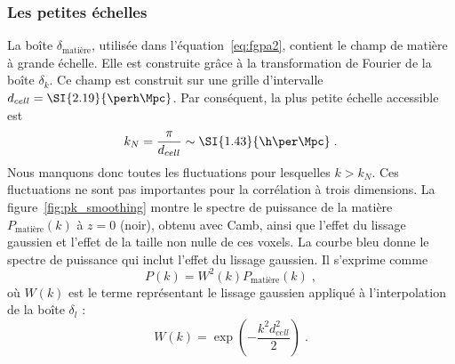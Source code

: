 \subsubsection{Les petites échelles}
La boîte $\delta_{\mathrm{matière}}$, utilisée dans l'équation~\ref{eq:fgpa2}, contient le champ de matière à grande échelle. Elle est construite grâce à la transformation de Fourier de la boîte $\delta_k$.
Ce champ est construit sur une grille d'intervalle $d_{cell} = \SI{2.19}{\perh\Mpc}$. Par conséquent, la plus petite échelle accessible est
\begin{equation}
  k_N = \frac{\pi}{d_{cell}} \sim \SI{1.43}{\h\per\Mpc} \; .
\end{equation}
Nous manquons donc toutes les fluctuations pour lesquelles $k > k_N$.
Ces fluctuations ne sont pas importantes pour la corrélation à trois dimensions. La figure~\ref{fig:pk_smoothing} montre le spectre de puissance de la matière $P_{\mathrm{matière}}(k)$ à $z=0$ (noir), obtenu avec Camb, ainsi que l'effet du lissage gaussien et l'effet de la taille non nulle de ces voxels.
  La courbe bleu donne le spectre de puissance qui inclut l'effet du lissage gaussien. Il s'exprime comme
  \begin{equation}
    P(k) =  W^2(k) P_{\mathrm{matière}}(k) \; ,
  \end{equation}
  où $W(k)$ est le terme représentant le lissage gaussien appliqué à l'interpolation de la boîte $\delta_l$ :
  \begin{equation}
    \label{eq:gauss_smoothing}
    W(k) = \exp(- \frac{k^2 d_{cell}^2}{2}) \; .
  \end{equation}
